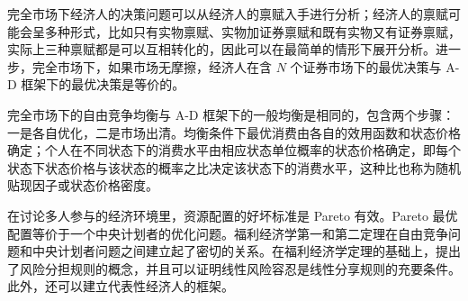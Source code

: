 

\begin{tcolorbox}[summary,title=本章小结]
完全市场下经济人的决策问题可以从经济人的禀赋入手进行分析；经济人的禀赋可能会呈多种形式，比如只有实物禀赋、实物加证券禀赋和既有实物又有证券禀赋，实际上三种禀赋都是可以互相转化的，因此可以在最简单的情形下展开分析。进一步，完全市场下，如果市场无摩擦，经济人在含 $N$ 个证券市场下的最优决策与 A-D 框架下的最优决策是等价的。

完全市场下的自由竞争均衡与 A-D 框架下的一般均衡是相同的，包含两个步骤：一是各自优化，二是市场出清。均衡条件下最优消费由各自的效用函数和状态价格确定；个人在不同状态下的消费水平由相应状态单位概率的状态价格确定，即每个状态下状态价格与该状态的概率之比决定该状态下的消费水平，这种比也称为随机贴现因子或状态价格密度。

在讨论多人参与的经济环境里，资源配置的好坏标准是 Pareto 有效。Pareto 最优配置等价于一个中央计划者的优化问题。福利经济学第一和第二定理在自由竞争问题和中央计划者问题之间建立起了密切的关系。在福利经济学定理的基础上，提出了风险分担规则的概念，并且可以证明线性风险容忍是线性分享规则的充要条件。此外，还可以建立代表性经济人的框架。
\end{tcolorbox}



